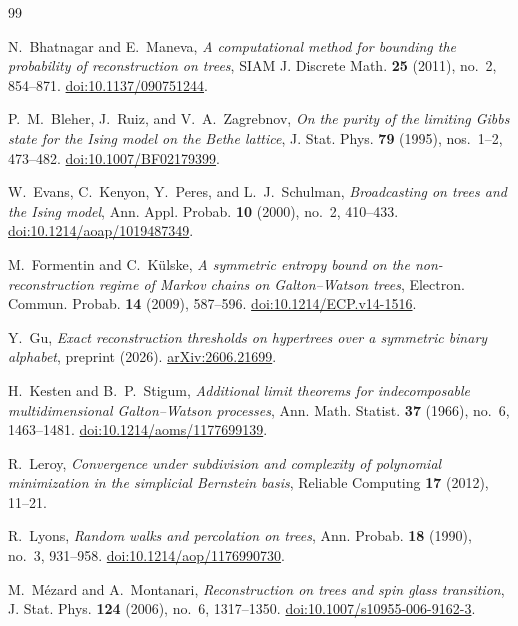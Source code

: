 \begin{thebibliography}{99}

N.~Bhatnagar and E.~Maneva,
\emph{A computational method for bounding the probability of reconstruction
on trees}, SIAM J. Discrete Math. \textbf{25} (2011), no.~2, 854--871.
\href{https://doi.org/10.1137/090751244}{doi:10.1137/090751244}.

P.~M.~Bleher, J.~Ruiz, and V.~A.~Zagrebnov,
\emph{On the purity of the limiting Gibbs state for the Ising model
on the Bethe lattice},
J. Stat. Phys. \textbf{79} (1995), nos.~1--2, 473--482.
\href{https://doi.org/10.1007/BF02179399}{doi:10.1007/BF02179399}.

W.~Evans, C.~Kenyon, Y.~Peres, and L.~J.~Schulman,
\emph{Broadcasting on trees and the Ising model},
Ann. Appl. Probab. \textbf{10} (2000), no.~2, 410--433.
\href{https://doi.org/10.1214/aoap/1019487349}{doi:10.1214/aoap/1019487349}.

M.~Formentin and C.~K\"ulske,
\emph{A symmetric entropy bound on the non-reconstruction regime of
Markov chains on Galton--Watson trees},
Electron. Commun. Probab. \textbf{14} (2009), 587--596.
\href{https://doi.org/10.1214/ECP.v14-1516}{doi:10.1214/ECP.v14-1516}.

Y.~Gu,
\emph{Exact reconstruction thresholds on hypertrees over a symmetric
binary alphabet}, preprint (2026).
\href{https://arxiv.org/abs/2606.21699}{arXiv:2606.21699}.

H.~Kesten and B.~P.~Stigum,
\emph{Additional limit theorems for indecomposable multidimensional
Galton--Watson processes},
Ann. Math. Statist. \textbf{37} (1966), no.~6, 1463--1481.
\href{https://doi.org/10.1214/aoms/1177699139}{doi:10.1214/aoms/1177699139}.

R.~Leroy,
\emph{Convergence under subdivision and complexity of polynomial
minimization in the simplicial Bernstein basis},
Reliable Computing \textbf{17} (2012), 11--21.

R.~Lyons,
\emph{Random walks and percolation on trees},
Ann. Probab. \textbf{18} (1990), no.~3, 931--958.
\href{https://doi.org/10.1214/aop/1176990730}{doi:10.1214/aop/1176990730}.

M.~M\'ezard and A.~Montanari,
\emph{Reconstruction on trees and spin glass transition},
J. Stat. Phys. \textbf{124} (2006), no.~6, 1317--1350.
\href{https://doi.org/10.1007/s10955-006-9162-3}{doi:10.1007/s10955-006-9162-3}.


\end{thebibliography}
